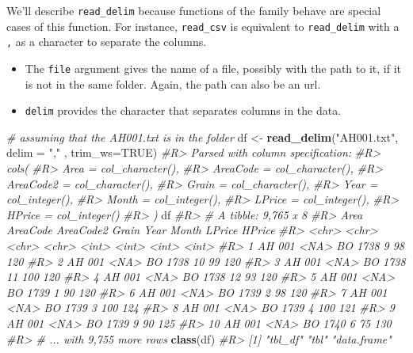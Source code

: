 \documentclass[]{book}
\newenvironment{Shaded}{}{}
\newcommand{\CommentTok}[1]{\textcolor[rgb]{0.38,0.63,0.69}{\textit{#1}}}
\newcommand{\DataTypeTok}[1]{\textcolor[rgb]{0.56,0.13,0.00}{#1}}
\newcommand{\KeywordTok}[1]{\textcolor[rgb]{0.00,0.44,0.13}{\textbf{#1}}}
\newcommand{\NormalTok}[1]{#1}
\newcommand{\OtherTok}[1]{\textcolor[rgb]{0.00,0.44,0.13}{#1}}
\newcommand{\StringTok}[1]{\textcolor[rgb]{0.25,0.44,0.63}{#1}}
\providecommand{\tightlist}{%
  \setlength{\itemsep}{0pt}\setlength{\parskip}{0pt}}
\theoremstyle{definition}
\theoremstyle{definition}
\theoremstyle{definition}
\theoremstyle{remark}
\begin{document}
We'll describe \texttt{read\_delim} because functions of the family
behave are special cases of this function. For instance,
\texttt{read\_csv} is equivalent to \texttt{read\_delim} with a
\texttt{,} as a character to separate the columns.

\begin{itemize}
\tightlist
\item
  The \texttt{file} argument gives the name of a file, possibly with the
  path to it, if it is not in the same folder. Again, the path can also
  be an url.\\
\item
  \texttt{delim} provides the character that separates columns in the
  data.
\end{itemize}

\begin{Shaded}
\begin{Highlighting}[]
\CommentTok{# assuming that the AH001.txt is in the folder}
\NormalTok{df <-}\StringTok{ }\KeywordTok{read_delim}\NormalTok{(}\StringTok{"AH001.txt"}\NormalTok{, }\DataTypeTok{delim =} \StringTok{","}\NormalTok{ , }\DataTypeTok{trim_ws=}\OtherTok{TRUE}\NormalTok{)}
\CommentTok{#R> Parsed with column specification:}
\CommentTok{#R> cols(}
\CommentTok{#R>   Area = col_character(),}
\CommentTok{#R>   AreaCode = col_character(),}
\CommentTok{#R>   AreaCode2 = col_character(),}
\CommentTok{#R>   Grain = col_character(),}
\CommentTok{#R>   Year = col_integer(),}
\CommentTok{#R>   Month = col_integer(),}
\CommentTok{#R>   LPrice = col_integer(),}
\CommentTok{#R>   HPrice = col_integer()}
\CommentTok{#R> )}
\NormalTok{df}
\CommentTok{#R> # A tibble: 9,765 x 8}
\CommentTok{#R>    Area  AreaCode AreaCode2 Grain  Year Month LPrice HPrice}
\CommentTok{#R>    <chr> <chr>    <chr>     <chr> <int> <int>  <int>  <int>}
\CommentTok{#R>  1 AH    001      <NA>      BO     1738     9     98    120}
\CommentTok{#R>  2 AH    001      <NA>      BO     1738    10     99    120}
\CommentTok{#R>  3 AH    001      <NA>      BO     1738    11    100    120}
\CommentTok{#R>  4 AH    001      <NA>      BO     1738    12     93    120}
\CommentTok{#R>  5 AH    001      <NA>      BO     1739     1     90    120}
\CommentTok{#R>  6 AH    001      <NA>      BO     1739     2     98    120}
\CommentTok{#R>  7 AH    001      <NA>      BO     1739     3    100    124}
\CommentTok{#R>  8 AH    001      <NA>      BO     1739     4    100    121}
\CommentTok{#R>  9 AH    001      <NA>      BO     1739     9     90    125}
\CommentTok{#R> 10 AH    001      <NA>      BO     1740     6     75    130}
\CommentTok{#R> # ... with 9,755 more rows}
\KeywordTok{class}\NormalTok{(df)}
\CommentTok{#R> [1] "tbl_df"     "tbl"        "data.frame"}
\end{Highlighting}
\end{Shaded}
\end{document}
